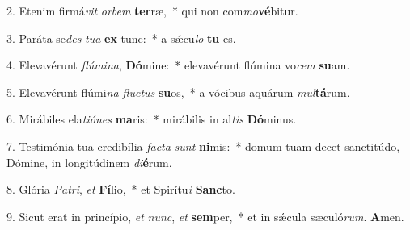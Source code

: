 2. Etenim firmá\textit{vit} \textit{or}\textit{bem} \textbf{ter}ræ,~*  qui non com\textit{mo}\textbf{vé}bitur.\

3. Paráta se\textit{des} \textit{tu}\textit{a} \textbf{ex} tunc:~*  a sǽcu\textit{lo} \textbf{tu} es.\

4. Elevavérunt \textit{flú}\textit{mi}\textit{na}, \textbf{Dó}mine:~*  elevavérunt flúmina vo\textit{cem} \textbf{su}am.\

5. Elevavérunt flúmi\textit{na} \textit{fluc}\textit{tus} \textbf{su}os,~*  a vócibus aquárum \textit{mul}\textbf{tá}rum.\

6. Mirábiles ela\textit{ti}\textit{ó}\textit{nes} \textbf{ma}ris:~*  mirábilis in al\textit{tis} \textbf{Dó}minus.\

7. Testimónia tua credibília \textit{fac}\textit{ta} \textit{sunt} \textbf{ni}mis:~*  domum tuam decet sanctitúdo, Dómine, in longitúdinem \textit{di}\textbf{é}rum.\

8. Glória \textit{Pa}\textit{tri}, \textit{et} \textbf{Fí}lio,~*  et Spirítu\textit{i} \textbf{Sanc}to.\

9. Sicut erat in princípio, \textit{et} \textit{nunc}, \textit{et} \textbf{sem}per,~*  et in sǽcula sæculó\textit{rum}. \textbf{A}men.\

